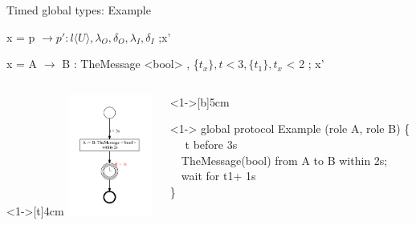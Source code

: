 \documentclass[8 pt]{beamer}
\newcommand{\UT}{\ensuremath{U}}
\newcommand{\BLUE}{\color[rgb]{0,0,0.69}}
\begin{document}
\begin{frame}{Timed global types: Example}
\begin{center}
x  = p $\rightarrow p' : l \langle \UT \rangle, \lambda_{O}, \delta_{O}, \lambda_{I}, \delta_{I}$ ;x'
\end{center}
\begin{center}
x = A $\rightarrow$ B : TheMessage <bool> , \{$t_{x}\}, t < 3, \{t_1\}, t_{x}$ < 2  ;  x’ 
\end{center}
\begin{columns}
\begin{column}<1->[t]{4cm}
\includegraphics[height=4cm]{ExampleCFSM}
\end{column}
\begin{column}<1->[b]{5cm}
\begin{exampleblock}<1->{}
{\BLUE global protocol} Example (role A, role B) \{ \\
~~ t {\BLUE before} 3s\\
~~TheMessage(bool) {\BLUE from} A {\BLUE to} B {\BLUE within} 2s;\\
~~{\BLUE wait for} t1+ 1s\\
\}\\
~~\\
~~\\
\end{exampleblock}
\end{column}
\end{columns}
\end{frame}
\end{document}
